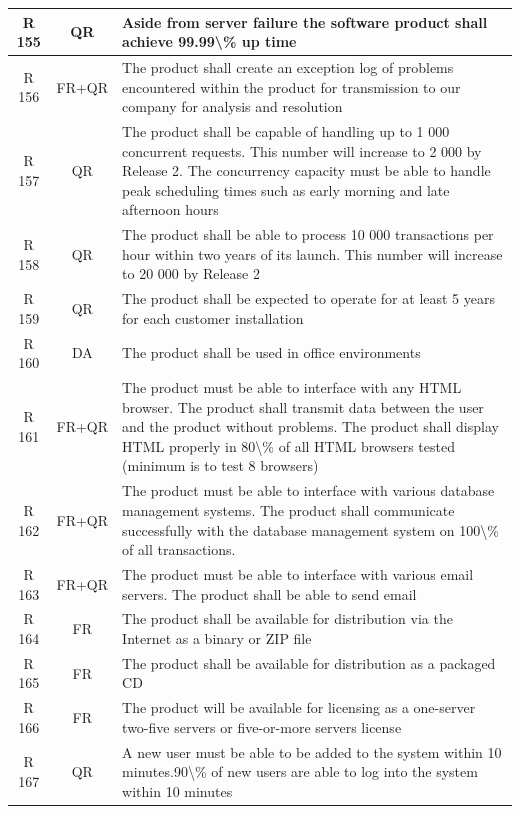 \documentclass[dissertation,final]{softeng}
\begin{document}
\begin{appendices}
{\begin{center}
\begin{longtable}{c c m{}}
    R 155   & QR & Aside from server failure the software product shall achieve 99.99\textbackslash{}\% up time \\    \midrule
    R 156   & FR+QR &  The product shall create an exception log of problems encountered within the product for transmission to our company for analysis and resolution \\    \midrule
    R 157   & QR & The product shall be capable of handling up to 1 000 concurrent requests. This number will increase to 2 000 by Release 2. The concurrency capacity must be able to handle peak scheduling times such as early morning and late afternoon hours \\    \midrule
    R 158   & QR & The product shall be able to process 10 000 transactions per hour within two years of its launch. This number will increase to 20 000 by Release 2 \\    \midrule
    R 159   & QR & The product shall be expected to operate for at least 5 years for each customer installation \\    \midrule
    R 160   & DA & The product shall be used in office environments \\    \midrule
    R 161   & FR+QR & The product must be able to interface with any HTML browser. The product shall transmit data between the user and the product without problems. The product shall display HTML properly in 80\textbackslash{}\% of all HTML browsers tested (minimum is to test 8 browsers) \\    \midrule
    R 162   & FR+QR & The product must be able to interface with various database management systems. The product shall communicate successfully with the database management system on 100\textbackslash{}\% of all transactions. \\    \midrule
    R 163   & FR+QR & The product must be able to interface with various email servers. The product shall be able to send email \\    \midrule
    R 164   & FR & The product shall be available for distribution via the Internet as a binary or ZIP file \\    \midrule
    R 165   & FR & The product shall be available for distribution as a packaged CD \\    \midrule
    R 166   & FR & The product will be available for licensing as a one-server two-five servers or five-or-more servers license \\    \midrule
    R 167   & QR & A new user must be able to be added to the system within 10 minutes.90\textbackslash{}\% of new users are able to log into the system within 10 minutes \\    \midrule

\end{longtable}
\end{center}}
\end{appendices}
\end{document}
